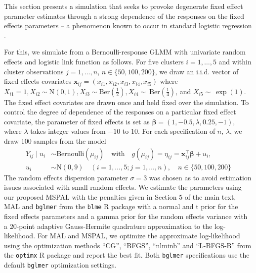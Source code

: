 \documentclass[11pt, a4paper]{article}
\newcommand*{\bb}{\boldsymbol}
\theoremstyle{example} \newtheorem{example}{Example}[section]
\theoremstyle{theorem} \newtheorem{theorem}{Theorem}[section]
\theoremstyle{theorem }\newtheorem{proposition}{Proposition}[section]
\theoremstyle{theorem }\newtheorem{corollary}{Corollary}[section]
\def\\bbeta{\bb{\\bbeta}}
\def\bx{\bb{x}}
\begin{document}
This section presents a simulation that seeks to provoke degenerate fixed effect parameter estimates through a strong dependence of the responses on the fixed effects parameters -- a phenomenon known to occur in standard logistic regression \citep{albert+anderson:1984,kosmidis+firth:2020}.

For this, we simulate from a Bernoulli-response GLMM with univariate random effects and logistic link function as follows. For five clusters $i=1,\ldots,5$ and within cluster observations $j=1,\ldots,n$, $n \in \{50,100,200\}$, we draw an i.i.d. vector of fixed effects covariates $\bx_{ij} = (x_{i1},x_{i2},x_{i3},x_{i4},x_{i5})$ where $X_{i1}=1, {X}_{i2} \sim \text{N}(0,1), {X}_{i3}\sim \textrm{Ber}\left(\frac{1}{2}\right), {X}_{i4}\sim~\textrm{Ber}\left(\frac{1}{4}\right)$, and ${X}_{i5}\sim~\exp(1)$. The fixed effect covariates are drawn once and held fixed over the simulation. To control the degree of dependence of the responses on a particular fixed effect covariate, the parameter of fixed effects is set as $\bb \beta=(1,-0.5,\lambda,0.25,-1)$, where $\lambda$ takes integer values from $-10$ to $10$. For each specification of $n$, $\lambda$, we draw 100 samples from the model 
\begin{equation}
	\begin{aligned}
		\label{eq:sim1_model} 
		Y_{ij} \mid {u}_i & \sim \text{Bernoulli}(\mu_{ij}) \quad \text{with} \quad
		g(\mu_{ij}) = \eta_{ij} = \bx_{ij}^\top \bb \beta + u_i,\\
		u_i & \sim \text{N}(0, 9)  \quad (i = 1, \ldots, 5; j = 1, \ldots, n), \quad n\in \{50,100,200\}
	\end{aligned}
\end{equation}
The random effects dispersion parameter $\sigma = 3$ was chosen as to avoid estimation issues associated with small random effects. We estimate the parameters using our proposed MSPAL with the penalties given in Section 5 of the main text, MAL and \texttt{bglmer}  from the \texttt{blme} R package \citep{chung+etal:2013} with a normal and t prior for the fixed effects parameters and a gamma prior for the random effects variance with a 20-point adaptive Gauss-Hermite quadrature approximation to the log-likelihood. For MAL and MSPAL, we optimize the approximate log-likelihood using the optimization methods ``CG'', ``BFGS'', ``nlminb'' and ``L-BFGS-B'' from the \texttt{optimx} R package \citep{nash+varadhan:2011} and report the best fit. Both \texttt{bglmer} specifications use the default \texttt{bglmer} optimization settings. 
\end{document}
